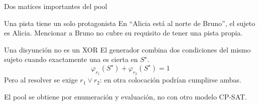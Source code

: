 \documentclass[aspectratio=169,11pt]{beamer}
\begin{document}
\begin{frame}{Dos matices importantes del pool}
  \begin{block}{Una pista tiene un solo protagonista}
    En ``Alicia est\'a al norte de Bruno'', el sujeto es Alicia.
    Mencionar a Bruno no cubre su requisito de tener una pista propia.
  \end{block}
  \vspace{2mm}
  \begin{block}{Una disyunci\'on no es un XOR}
    El generador combina dos condiciones del mismo sujeto cuando
    exactamente una es cierta en \(S^\star\).
    \[
      \varphi_{r_1}(S^\star)+\varphi_{r_2}(S^\star)=1
    \]
    Pero al resolver se exige \(r_1\lor r_2\):
    en otra colocaci\'on podr\'ian cumplirse ambas.
  \end{block}
  \small El pool se obtiene por enumeraci\'on y evaluaci\'on,
  no con otro modelo CP-SAT.
\end{frame}
\end{document}
